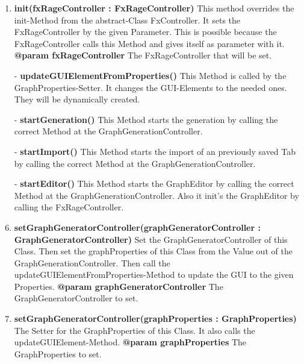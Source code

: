 \documentclass{article}
\begin{document}
				\begin{enumerate}[+]
					\item{
						\textbf{init(fxRageController : FxRageController)} \newline
						This method overrides the init-Method from the abstract-Class FxController.
						It sets the FxRageController by the given Parameter.
						This is possible because the FxRageController calls this Method and gives itself as parameter with it.
						\newline
						\textbf{@param fxRageController}
							The FxRageController that will be set.
							\newline
					}
					\item[-]{
						\textbf{updateGUIElementFromProperties()} \newline
						This Method is called by the GraphProperties-Setter.
						It changes the GUI-Elements to the needed ones.
						They will be dynamically created.
						\newline
					}
					\item[-]{
						\textbf{startGeneration()} \newline
						This Method starts the generation by calling the correct Method at the GraphGenerationController.
						\newline
					}
					\item[-]{
						\textbf{startImport()} \newline
						This Method starts the import of an previously saved Tab by calling the correct Method at the GraphGenerationController.
						\newline
					}
					\item[-]{
						\textbf{startEditor()} \newline
						This Method starts the GraphEditor by calling the correct Method at the GraphGenerationController.
						Also it init's the GraphEditor by calling the FxRageController.
						\newline
					}
					\item{
						\textbf{setGraphGeneratorController(graphGeneratorController : GraphGeneratorController)} \newline
						Set the GraphGeneratorController of this Class.
						Then set the graphProperties of this Class from the Value out of the GraphGenerationController.
						Then call the updateGUIElementFromProperties-Method to update the GUI to the given Properties.
						\newline
						\textbf{@param graphGeneratorController}
							The GraphGeneratorController to set.
							\newline
					}
					\item{
						\textbf{setGraphGeneratorController(graphProperties : GraphProperties)} \newline
						The Setter for the GraphProperties of this Class.
						It also calls the updateGUIElement-Method.
						\newline
						\textbf{@param graphProperties}
							The GraphProperties to set.
							\newline
					}
				\end{enumerate}
		
\end{document}
